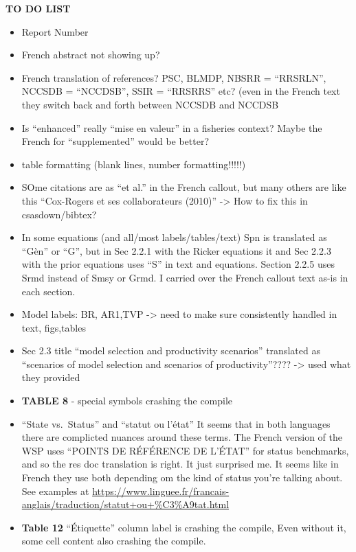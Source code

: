 \documentclass[french,11pt]{book}
\begin{document}
\renewcommand{\tablename}{Tableau}
\frontmatter

\textbf{TO DO LIST}
\begin{itemize}

\item
  Report Number
\item
  French abstract not showing up?
\item
  French translation of references? PSC, BLMDP, NBSRR = ``RRSRLN'', NCCSDB = ``NCCDSB'', SSIR = ``RRSRRS'' etc? (even in the French text they switch back and forth between NCCSDB and NCCDSB
\item
  Is ``enhanced'' really ``mise en valeur'' in a fisheries context? Maybe the French for ``supplemented'' would be better?
\item
  table formatting (blank lines, number formatting!!!!!)
\item
  SOme citations are as ``et al.'' in the French callout, but many others are like this ``Cox-Rogers et ses collaborateurs (2010)'' -\textgreater{} How to fix this in csasdown/bibtex?
\item
  In some equations (and all/most labels/tables/text) Spn is translated as ``Gèn'' or ``G'', but in Sec 2.2.1 with the Ricker equations it and Sec 2.2.3 with the prior equations uses ``S'' in text and equations. Section 2.2.5 uses Srmd instead of Smsy or Grmd. I carried over the French callout text as-is in each section.
\item
  Model labels: BR, AR1,TVP -\textgreater{} need to make sure consistently handled in text, figs,tables
\item
  Sec 2.3 title ``model selection and productivity scenarios'' translated as ``scenarios of model selection and scenarios of productivity''???? -\textgreater{} used what they provided
\item
  \textbf{TABLE 8} - special symbols crashing the compile
\item
  ``State vs.~Status'' and ``statut ou l'état'' It seems that in both languages there are complicted nuances around these terms. The French version of the WSP uses ``POINTS DE RÉFÉRENCE DE L'ÉTAT'' for status benchmarks, and so the res doc translation is right. It just surprised me. It seems like in French they use both depending om the kind of status you're talking about. See examples at \url{https://www.linguee.fr/francais-anglais/traduction/statut+ou+\%C3\%A9tat.html}
\item
  \textbf{Table 12} ``Étiquette'' column label is crashing the compile, Even without it, some cell content also crashing the compile.
\end{itemize}
\end{document}
